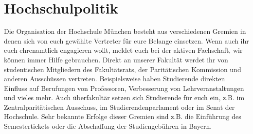 \section{Hochschulpolitik}
Die Organisation der Hochschule München besteht aus verschiedenen 
Gremien in denen sich von euch gewählte Vertreter für eure Belange 
einsetzen. Wenn auch ihr euch ehrenamtlich engagieren wollt, meldet 
euch bei der aktiven Fachschaft, wir können immer Hilfe gebrauchen. \doublebreak
Direkt an unserer Fakultät werdet ihr von studentischen Mitgliedern des 
Fakultätsrats, der Paritätischen Kommission und anderen Ausschüssen 
vertreten. Beispielsweise haben Studierende direkten Einfluss  auf 
Berufungen von Professoren, Verbesserung von Lehrveranstaltungen 
und vieles mehr. \doublebreak
Auch überfakultär setzen sich Studierende für euch ein, z.B. im 
Zentralparitätischen Ausschuss, im Studierendenparlament oder im 
Senat der Hochschule. Sehr bekannte Erfolge dieser Gremien sind 
z.B. die Einführung des Semestertickets oder die Abschaffung  der 
Studiengebühren in Bayern.



